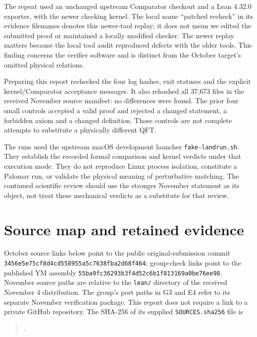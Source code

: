 \documentclass[11pt]{article}
\newcommand{\code}[1]{{\small\nolinkurl{#1}}}
\begin{document}
The repeat used an unchanged upstream Comparator checkout and a Lean 4.32.0
exporter, with the newer checking kernel. The local name ``patched recheck''
in its evidence filenames denotes this newer-tool replay; it does not mean
we edited the submitted proof or maintained a locally modified checker.
The newer replay matters because the local tool audit reproduced defects
with the older tools. This finding concerns the verifier software and is
distinct from the October target's omitted physical relations.

Preparing this report rechecked the four log hashes, exit statuses and the
explicit kernel/Comparator acceptance messages. It also rehashed all 37,673
files in the received November source manifest: no differences were found.
The prior four small controls accepted a valid proof and rejected a changed
statement, a forbidden axiom and a changed definition. Those controls are
not complete attempts to substitute a physically different QFT.

The runs used the upstream macOS development launcher
\code{fake-landrun.sh}. They establish the recorded formal comparison and
kernel verdicts under that execution mode. They do not reproduce Linux
process isolation, constitute a Palomar run, or validate the physical
meaning of perturbative matching. The continued scientific review should
use the stronger November statement as its object, not treat these mechanical
verdicts as a substitute for that review.

\appendix
\section{Source map and retained evidence}
\label{sec:sources}

October source links below point to the public original-submission commit
\code{3456e5e75cf8d4cd558955a5c7638fba2d68f464}; group-check links point to
the published YM assembly \code{55ba9fc36293b3f4d52c6b1f813169a0be76ee98}.
November source paths are relative to the \code{lean/} directory of the received
November 4 distribution. The group's port paths in G3 and E4 refer to its
separate November verification package. This report does not require a link
to a private GitHub repository. The SHA-256 of its supplied
\code{SOURCES.sha256} file is
\begin{quote}\small{}.\end{quote}
\end{document}
